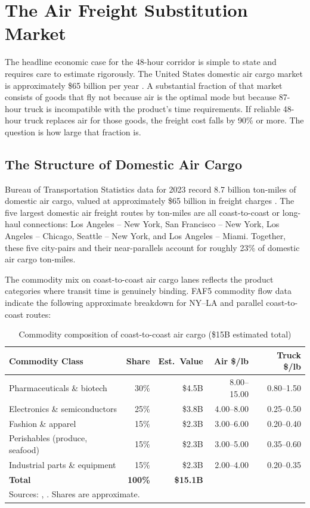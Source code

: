 \section{The Air Freight Substitution Market}
\label{sec:air}

The headline economic case for the 48-hour corridor is simple to state and requires care
to estimate rigorously. The United States domestic air cargo market is approximately
\$65 billion per year \citep{BTS_airfreight2023}. A substantial fraction of that market
consists of goods that fly not because air is the optimal mode but because 87-hour truck
is incompatible with the product's time requirements. If reliable 48-hour truck replaces
air for those goods, the freight cost falls by 90\% or more. The question is how large
that fraction is.

\subsection{The Structure of Domestic Air Cargo}

Bureau of Transportation Statistics data for 2023 record 8.7 billion ton-miles of domestic
air cargo, valued at approximately \$65 billion in freight charges \citep{BTS_airfreight2023}.
The five largest domestic air freight routes by ton-miles are all coast-to-coast or
long-haul connections: Los Angeles -- New York, San Francisco -- New York, Los Angeles
-- Chicago, Seattle -- New York, and Los Angeles -- Miami. Together, these five
city-pairs and their near-parallels account for roughly 23\% of domestic air cargo
ton-miles.

The commodity mix on coast-to-coast air cargo lanes reflects the product categories where
transit time is genuinely binding. FAF5 commodity flow data \citep{FAF5_2023} indicate the
following approximate breakdown for NY--LA and parallel coast-to-coast routes:

\begin{table}[h]
\centering
\caption{Commodity composition of coast-to-coast air cargo (\$15B estimated total)}
\label{tab:air_commodities}
\begin{tabular}{lrrrr}
\toprule
Commodity Class & Share & Est.\ Value & Air \$/lb & Truck \$/lb \\
\midrule
Pharmaceuticals \& biotech        & 30\% & \$4.5B & 8.00--15.00 & 0.80--1.50 \\
Electronics \& semiconductors     & 25\% & \$3.8B & 4.00--8.00  & 0.25--0.50 \\
Fashion \& apparel                & 15\% & \$2.3B & 3.00--6.00  & 0.20--0.40 \\
Perishables (produce, seafood)    & 15\% & \$2.3B & 3.00--5.00  & 0.35--0.60 \\
Industrial parts \& equipment     & 15\% & \$2.3B & 2.00--4.00  & 0.20--0.35 \\
\midrule
\textbf{Total}                    & \textbf{100\%} & \textbf{\$15.1B} & & \\
\bottomrule
\multicolumn{5}{l}{\footnotesize Sources: \citet{BTS_airfreight2023}, \citet{FAF5_2023}. Shares are approximate.} \\
\end{tabular}
\end{table}

